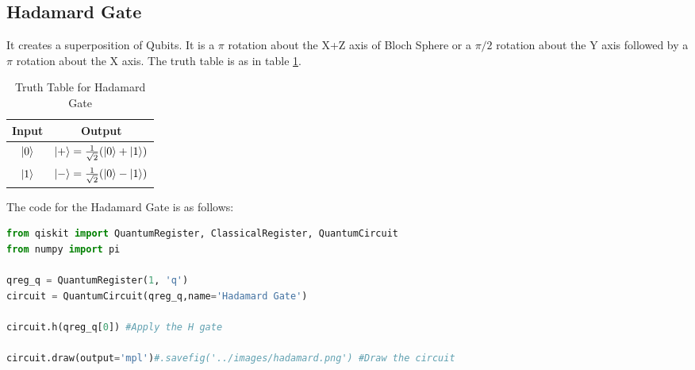 \subsection{Hadamard Gate}\label{qgate:hadamard}
It creates a superposition of Qubits. 
It is a $\pi$ rotation about the X+Z axis of Bloch Sphere or 
a $\pi/2$ rotation about the Y axis followed by a $\pi$ rotation about the X axis.
The truth table is as in table \ref{tab:hadamard}.
\begin{table}[ht]
    \centering
    \begin{tabular}{|c|c|}
        \hline
        Input & Output\\
        \hline
        $\ket{0}$ & $\ket{+}=\frac{1}{\sqrt{2}}(\ket{0}+\ket{1})$\\
        $\ket{1}$ & $\ket{-}=\frac{1}{\sqrt{2}}(\ket{0}-\ket{1})$\\
        \hline
    \end{tabular}
    \caption{Truth Table for Hadamard Gate}
    \label{tab:hadamard}
\end{table}

The code for the Hadamard Gate is as follows:
\begin{lstlisting}[language=Python]
from qiskit import QuantumRegister, ClassicalRegister, QuantumCircuit
from numpy import pi

qreg_q = QuantumRegister(1, 'q')
circuit = QuantumCircuit(qreg_q,name='Hadamard Gate')

circuit.h(qreg_q[0]) #Apply the H gate

circuit.draw(output='mpl')#.savefig('../images/hadamard.png') #Draw the circuit
\end{lstlisting}

